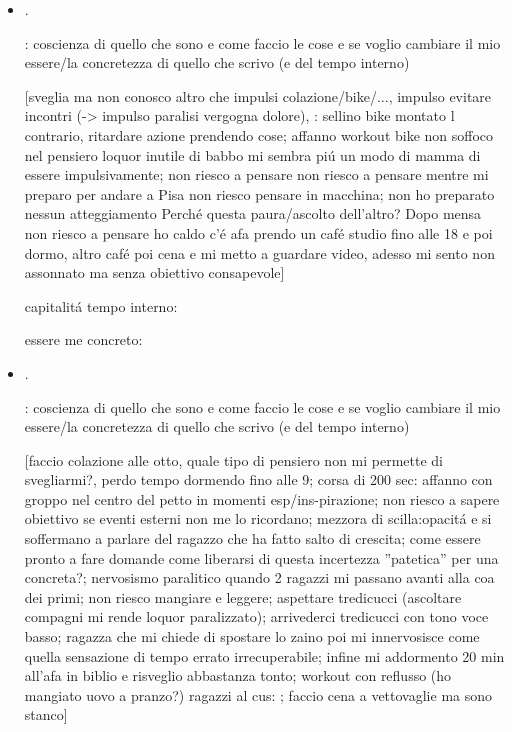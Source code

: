 \begin{itemize}
\item {}.

: coscienza di quello che sono e come faccio le cose e se voglio cambiare il mio essere/la concretezza di quello che scrivo (e del tempo interno)

[sveglia ma non conosco altro che impulsi colazione/bike/..., impulso evitare incontri (-> impulso paralisi vergogna dolore), : sellino bike montato l contrario, ritardare azione prendendo cose; affanno workout bike non soffoco nel pensiero loquor inutile di babbo mi sembra pi\'u un modo di mamma di essere impulsivamente; non riesco a pensare non riesco a pensare mentre mi preparo per andare a Pisa non riesco pensare in macchina; non ho preparato nessun atteggiamento Perch\'e questa paura/ascolto dell'altro? Dopo mensa non riesco a pensare ho caldo c'\'e afa prendo un caf\'e studio fino alle 18 e poi dormo, altro caf\'e poi cena e mi metto a guardare video, adesso mi sento non assonnato ma senza obiettivo consapevole]

capitalit\'a tempo interno:

essere me concreto: 

\item {}.

: coscienza di quello che sono e come faccio le cose e se voglio cambiare il mio essere/la concretezza di quello che scrivo (e del tempo interno)

[faccio colazione alle otto, quale tipo di pensiero non mi permette di svegliarmi?, perdo tempo dormendo fino alle 9; corsa di 200 sec: affanno con groppo nel centro del petto in momenti esp/ins-pirazione; non riesco a sapere obiettivo se eventi esterni non me lo ricordano; mezzora di scilla:opacit\'a e si soffermano a parlare del ragazzo che ha fatto salto di crescita; come essere pronto a fare domande come liberarsi di questa incertezza ''patetica'' per una concreta?; nervosismo paralitico quando 2 ragazzi mi passano avanti alla coa dei primi; non riesco mangiare e leggere; aspettare tredicucci (ascoltare compagni mi rende loquor paralizzato); arrivederci tredicucci con tono voce basso; ragazza che mi chiede di spostare lo zaino poi mi innervosisce come quella sensazione di tempo errato irrecuperabile; infine mi addormento 20 min all'afa in biblio e risveglio abbastanza tonto; workout con reflusso (ho mangiato uovo a pranzo?) ragazzi al cus: ; faccio cena a vettovaglie ma sono stanco]


\end{itemize}

